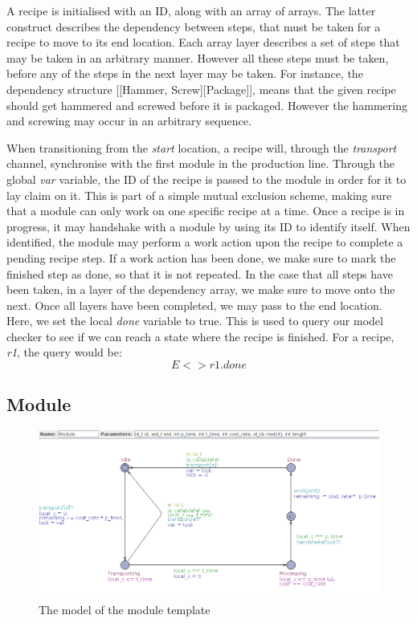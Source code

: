 A recipe is initialised with an ID, along with an array of arrays. The latter construct describes the dependency between steps, that must be taken for a recipe to move to its end location. Each array layer describes a set of steps that may be taken in an arbitrary manner. However all these steps must be taken, before any of the steps in the next layer may be taken. For instance, the dependency structure [[Hammer, Screw][Package]], means that the given recipe should get hammered and screwed before it is packaged. However the hammering and screwing may occur in an arbitrary sequence.


When transitioning from the \emph{start} location, a recipe will, through the \emph{transport} channel, synchronise with the first module in the production line. Through the global \emph{var} variable, the ID of the recipe is passed to the module in order for it to lay claim on it. This is part of a simple mutual exclusion scheme, making sure that a module can only work on one specific recipe at a time. Once a recipe is in progress, it may handshake with a module by using its ID to identify itself. When identified, the module may perform a work action upon the recipe to complete a pending recipe step. If a work action has been done, we make sure to mark the finished step as done, so that it is not repeated. In the case that all steps have been taken, in a layer of the dependency array, we make sure to move onto the next. Once all layers have been completed, we may pass to the end location. Here, we set the local \emph{done} variable to true. This is used to query our model checker to see if we can reach a state where the recipe is finished. For a recipe, \emph{r1}, the query would be: \[E<> r1.done\]

\subsection{Module}
\label{subs:module}

\begin{figure}[h]
\centering
\includegraphics[width=\textwidth]{images/firstmodule.png}
\caption{The model of the module template}
\label{fig:firstmodule}
\end{figure}


